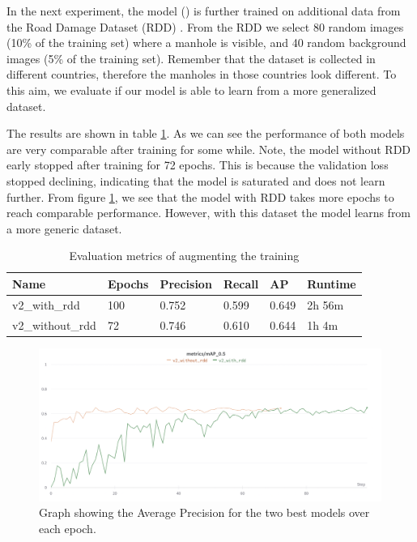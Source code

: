 In the next experiment, the model () is further trained on additional data from the Road Damage Dataset (RDD) \cite{road-damage-detector}. From the RDD we select 80 random images (10\% of the training set) where a manhole is visible, and 40 random background images (5\% of the training set). Remember that the dataset is collected in different countries, therefore the manholes in those countries look different. To this aim, we evaluate if our model is able to learn from a more generalized dataset.

The results are shown in table \ref{tab:results-yolo-v2}. As we can see the performance of both models are very comparable after training for some while. Note, the model without RDD early stopped after training for 72 epochs. This is because the validation loss stopped declining, indicating that the model is saturated and does not learn further. From figure \ref{fig:results-yolo-v2}, we see that the model with RDD takes more epochs to reach comparable performance. However, with this dataset the model learns from a more generic dataset. 

\begin{table}[ht]
\centering
\begin{tabular}{|l|l|l|l|l|l|}
\hline
\textbf{Name}    & \textbf{Epochs} & \textbf{Precision} & \textbf{Recall} & \textbf{AP} & \textbf{Runtime} \\ \hline
v2\_with\_rdd    & 100             & 0.752              & 0.599           & 0.649       & 2h 56m           \\ \hline
v2\_without\_rdd & 72              & 0.746              & 0.610           & 0.644       & 1h 4m            \\ \hline
\end{tabular}
\captionsetup{width=.90\textwidth}
\caption{Evaluation metrics of augmenting the training }
\label{tab:results-yolo-v2}
\end{table}

\begin{figure}[ht]
\begin{center}
\includegraphics[height=5cm,keepaspectratio]{images/6_results/v2-yolo-rdd.png}
\end{center}
\captionsetup{width=.90\textwidth}
\caption{Graph showing the Average Precision for the two best models over each epoch.}
\label{fig:results-yolo-v2}
\end{figure}


